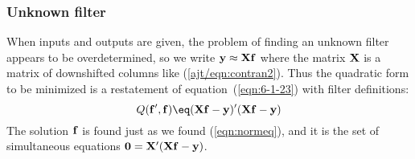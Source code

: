 \subsubsection{Unknown filter}
When inputs and outputs are given,
the problem of finding an unknown filter appears to be overdetermined,
so we write $\bold y \approx \bold X \bold f$
where the matrix $\bold X$ is a matrix of downshifted columns like
(\ref{ajt/eqn:contran2}).
Thus the quadratic form to be minimized
is a restatement of equation~(\ref{eqn:6-1-23})
with filter definitions:
\begin{equation}
Q(\bold f', \bold f) \eq
(\bold X\bold f - \bold y)'
(\bold X\bold f - \bold y)
\end{equation}
The solution $\bold f$ is found just as we found
(\ref{eqn:normeq}),
and it is the set of simultaneous equations
$ \bold 0 = \bold X'(\bold X\bold f - \bold y)$.

